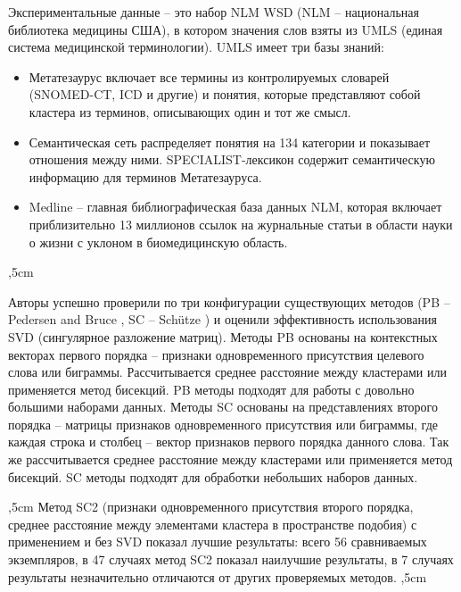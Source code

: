 \documentclass[12pt]{article}
\begin{document}
Экспериментальные данные -- это набор NLM WSD \cite{UMLS:website} (NLM -- национальная библиотека медицины США), в котором значения слов взяты из UMLS (единая система медицинской терминологии). UMLS имеет три базы знаний: 
\begin{itemize}
\item Метатезаурус включает все термины из контролируемых словарей (SNOMED-CT, ICD и другие) и понятия, которые представляют собой кластера из терминов, описывающих один и тот же смысл. 
\item Семантическая сеть распределяет понятия на 134 категории и показывает отношения между ними. SPECIALIST-лексикон содержит семантическую информацию для терминов Метатезауруса. 
\item Medline -- главная библиографическая база данных NLM, которая включает приблизительно 13 миллионов ссылок на журнальные статьи в области науки о жизни с уклоном в биомедицинскую область.
\end{itemize}
,5cm

Авторы успешно проверили по три конфигурации существующих методов (PB -- Pedersen and Bruce \cite{Pedersen}, SC -- Schütze \cite{Schutze}) и оценили эффективность использования SVD (сингулярное разложение матриц). Методы PB основаны на контекстных векторах первого порядка -- признаки одновременного присутствия целевого слова или биграммы. Рассчитывается среднее расстояние между кластерами или применяется  метод бисекций. PB методы подходят для работы с довольно большими наборами данных. Методы SC основаны на представлениях второго порядка -- матрицы признаков одновременного присутствия или биграммы, где каждая строка и столбец -- вектор признаков первого порядка данного слова. Так же рассчитывается среднее расстояние между кластерами или применяется  метод бисекций. SC методы подходят для обработки небольших наборов данных.  

,5cm
Метод SC2 (признаки одновременного присутствия второго порядка, среднее расстояние между элементами кластера в пространстве подобия) с применением и без SVD показал лучшие результаты: всего 56 сравниваемых экземпляров, в 47 случаях метод SC2 показал наилучшие результаты, в 7 случаях результаты незначительно отличаются от других проверяемых методов.
,5cm
\end{document}
